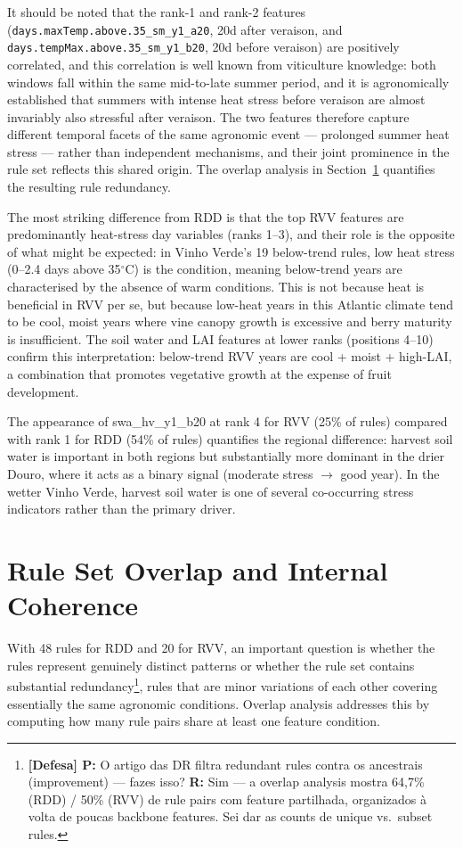 It should be noted that the rank-1 and rank-2 features (\texttt{days.maxTemp.above.35\_sm\_y1\_a20}, 20d after veraison, and \texttt{days.tempMax.above.35\_sm\_y1\_b20}, 20d before veraison) are positively correlated, and this correlation is well known from viticulture knowledge: both windows fall within the same mid-to-late summer period, and it is agronomically established that summers with intense heat stress before veraison are almost invariably also stressful after veraison. The two features therefore capture different temporal facets of the same agronomic event --- prolonged summer heat stress --- rather than independent mechanisms, and their joint prominence in the rule set reflects this shared origin. The overlap analysis in Section~\ref{sec:rule_set_overlap_and} quantifies the resulting rule redundancy.

The most striking difference from RDD is that the top RVV features are predominantly heat-stress day variables (ranks 1--3), and their role is the opposite of what might be expected: in Vinho Verde's 19 below-trend rules, low heat stress (0--2.4 days above 35$^\circ$C) is the condition, meaning below-trend years are characterised by the absence of warm conditions. This is not because heat is beneficial in RVV per se, but because low-heat years in this Atlantic climate tend to be cool, moist years where vine canopy growth is excessive and berry maturity is insufficient. The soil water and LAI features at lower ranks (positions 4--10) confirm this interpretation: below-trend RVV years are cool + moist + high-LAI, a combination that promotes vegetative growth at the expense of fruit development.

The appearance of swa\_hv\_y1\_b20 at rank 4 for RVV (25\% of rules) compared with rank 1 for RDD (54\% of rules) quantifies the regional difference: harvest soil water is important in both regions but substantially more dominant in the drier Douro, where it acts as a binary signal (moderate stress $\rightarrow$ good year). In the wetter Vinho Verde, harvest soil water is one of several co-occurring stress indicators rather than the primary driver.


\section{Rule Set Overlap and Internal Coherence}\label{sec:rule_set_overlap_and}

With 48 rules for RDD and 20 for RVV, an important question is whether the rules represent genuinely distinct patterns or whether the rule set contains substantial redundancy\footnote{\textbf{[Defesa] P:} O artigo das DR filtra redundant rules contra os ancestrais (improvement) --- fazes isso? \textbf{R:} Sim --- a overlap analysis mostra 64,7\% (RDD) / 50\% (RVV) de rule pairs com feature partilhada, organizados à volta de poucas backbone features. Sei dar as counts de unique vs.\ subset rules.}, rules that are minor variations of each other covering essentially the same agronomic conditions. Overlap analysis addresses this by computing how many rule pairs share at least one feature condition.


